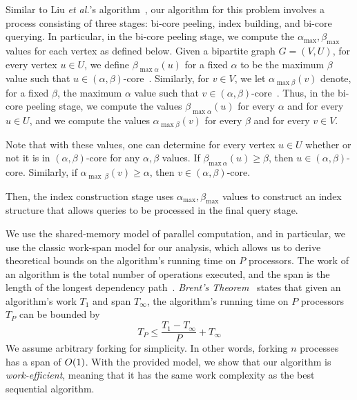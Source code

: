 Similar to Liu \textit{et al.}'s algorithm~\cite{Liu2020Efficient}, our algorithm for this problem involves a process consisting of three stages: bi-core peeling, index building, and bi-core querying.
In particular, in the bi-core peeling stage, we compute the $\alpha_{\max}, \beta_{\max}$ values for each vertex as defined below. Given a bipartite graph $G = (V, U)$, for every vertex $u \in U$, we define \emph{$\beta_{\max \alpha}(u)$} for a fixed $\alpha$ to be the maximum $\beta$ value such that $u\in (\alpha,\beta)$-core~\cite{Liu2020Efficient}. Similarly, for $v\in V$, we let \emph{$\alpha_{\max \beta}(v)$} denote, for a fixed $\beta$, the maximum $\alpha$ value such that $v\in (\alpha,\beta)$-core~\cite{Liu2020Efficient}.
Thus, in the bi-core peeling stage, we compute
the values $\beta_{\max \alpha}(u)$ for every $\alpha$ and for every $u \in U$, and we compute the values $\alpha_{\max \beta}(v)$ for every $\beta$ and for every $v \in V$. 


Note that with these values, one can determine for every vertex $u\in U$ whether or not it is in $(\alpha,\beta)$-core for any $\alpha,\beta$ values. If $\beta_{\text{max}\ \alpha} (u) \ge \beta$, then $u\in (\alpha,\beta)$-core. Similarly, if $\alpha_{\max\ \beta} (v) \ge \alpha$, then $v \in (\alpha,\beta)$-core. 

Then, the index construction stage uses $\alpha_{\max}, \beta_{\max}$ values to construct an index structure that allows queries to be processed in the final query stage. 

We use the shared-memory model of parallel computation, and in particular, we use the classic work-span model for our analysis, which allows us to derive theoretical bounds on the algorithm's running time on $P$ processors. 
The work of an algorithm is the total number of operations executed, and the span is the length of the longest dependency path~\cite{CLRS}.
\emph{Brent’s Theorem}~\cite{Brent1974} states that given an algorithm's work $T_1$ and span $T_\infty$, the algorithm's running time on $P$ processors $T_P$ can be bounded by 
$$ T_P \leq \frac{T_1-T_{\infty}}{P} + T_{\infty} $$
We assume arbitrary forking for simplicity. In other words, forking $n$ processes has a span of $O(1)$. With the provided model, we show that our algorithm is \emph{work-efficient}, meaning that it has the same work complexity as the best sequential algorithm.

